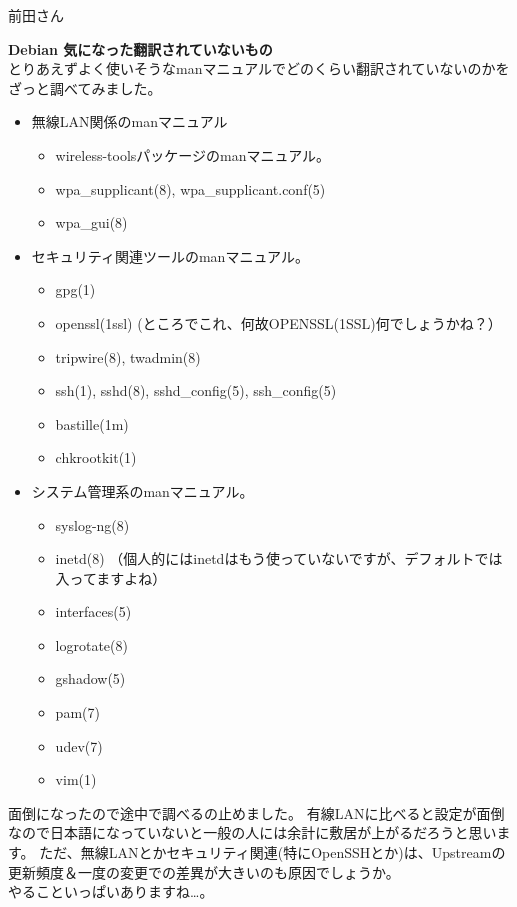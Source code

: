 \documentclass[cjk,dvipdfmx,12pt]{beamer}
\begin{document}
\begin{frame}{前田さん}

\textbf{Debian 気になった翻訳されていないもの}\\
とりあえずよく使いそうなmanマニュアルでどのくらい翻訳されていないのかをざっと調べてみました。
\begin{itemize}
  \item 無線LAN関係のmanマニュアル
    \begin{itemize}
      \item wireless-toolsパッケージのmanマニュアル。
      \item wpa\_supplicant(8), wpa\_supplicant.conf(5)
      \item wpa\_gui(8)
    \end{itemize}

  \item セキュリティ関連ツールのmanマニュアル。
    \begin{itemize}
      \item gpg(1)
      \item openssl(1ssl) (ところでこれ、何故OPENSSL(1SSL)何でしょうかね？）
      \item tripwire(8), twadmin(8)
      \item ssh(1), sshd(8), sshd\_config(5), ssh\_config(5)
      \item bastille(1m)
      \item chkrootkit(1)
    \end{itemize}
\end{itemize}
\end{frame}

\begin{frame}
\begin{itemize}
  \item システム管理系のmanマニュアル。
    \begin{itemize}
      \item syslog-ng(8)
      \item inetd(8) （個人的にはinetdはもう使っていないですが、デフォルトでは入ってますよね）
      \item interfaces(5)
      \item logrotate(8)
      \item gshadow(5)
      \item pam(7)
      \item udev(7)
      \item vim(1)
    \end{itemize}
\end{itemize}
面倒になったので途中で調べるの止めました。
有線LANに比べると設定が面倒なので日本語になっていないと一般の人には余計に敷居が上がるだろうと思います。
ただ、無線LANとかセキュリティ関連(特にOpenSSHとか)は、Upstreamの更新頻度＆一度の変更での差異が大きいのも原因でしょうか。\\
やることいっぱいありますね…。

\end{frame}
\end{document}
